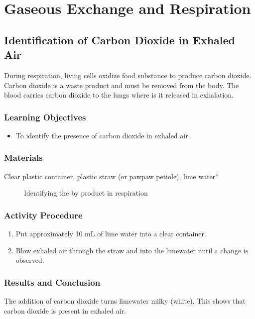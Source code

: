 \section{Gaseous Exchange and Respiration}

\subsection{Identification of Carbon Dioxide in Exhaled Air}

During respiration, living cells oxidize food substance to produce carbon dioxide. Carbon dioxide is a waste product and must be removed from the body. The blood carries carbon dioxide to the lungs where is it released in exhalation.

\subsubsection*{Learning Objectives}
\begin{itemize}
\item{To identify the presence of carbon dioxide in exhaled air.}
\end{itemize}

\subsubsection*{Materials}
Clear plastic container, plastic straw (or pawpaw petiole), lime water*

\begin{figure}
\begin{center}
\def\svgwidth{2cm}

\caption{Identifying the by product  in respiration}
\label{fig:CO2-limewater}
\end{center}
\end{figure}

\subsubsection*{Activity Procedure}
\begin{enumerate}
\item{Put approximately 10 mL of lime water into a clear container.}
\item{Blow exhaled air through the straw and into the limewater until a change is observed.}
\end{enumerate}

\subsubsection*{Results and Conclusion}
The addition of carbon dioxide turns limewater milky (white). This shows that carbon dioxide is present in exhaled air.

